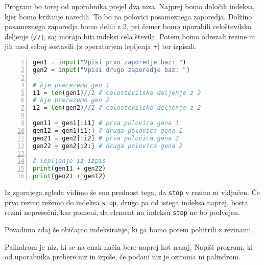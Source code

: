 \begin{resitev}
Program bo torej od uporabnika prejel dva niza. Najprej bomo določili indeksa, kjer bomo križanje naredili. To bo na polovici posameznega zaporedja. Dolžino posameznega zaporedja bomo delili z 2, pri čemer bomo uporabili celoštevilsko deljenje (\texttt{//}), saj morajo biti indeksi cela števila. Potem bomo odrezali rezine in jih med seboj sestavili (z operatorjem lepljenja \texttt{+}) ter izpisali.
\begin{lstlisting}[language=Python, showstringspaces=false,numbers=left]
gen1 = input("Vpisi prvo zaporedje baz: ")
gen2 = input("Vpisi drugo zaporedje baz: ")

# kje prerezemo gen 1
i1 = len(gen1)//2 # celostevilsko deljenje z 2
# kje prerezemo gen 2
i2 = len(gen2)//2 # celostevilsko deljenje z 2

gen11 = gen1[:i1] # prva polovica gena 1
gen12 = gen1[i1:] # druga polovica gena 1
gen21 = gen2[:i2] # prva polovica gena 2
gen22 = gen2[i2:] # druga polovica gena 2

# lepljenje iz izpis
print(gen11 + gen22) 
print(gen21 + gen12)
\end{lstlisting}
\end{resitev}
Iz zgornjega zgleda vidimo še eno prednost tega, da \texttt{stop} v rezino ni vključen. Če prvo rezino režemo do indeksa \texttt{stop}, drugo pa od istega indeksa naprej, bosta rezini nepresečni, kar pomeni, da element na indeksu \texttt{stop} ne bo podvojen.

Povadimo zdaj še običajno indeksiranje, ki ga bomo potem pohitrili z rezinami.

\begin{zgled}
Palindrom je niz, ki se na enak način bere naprej kot nazaj. Napiši program, ki od uporabnika prebere niz in izpiše, če podani niz je oziroma ni palindrom.
\end{zgled}

